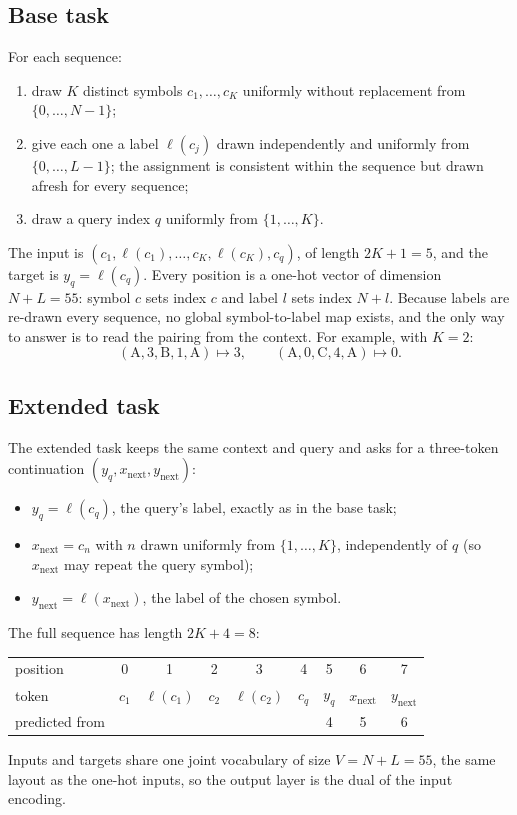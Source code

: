 \documentclass[11pt,a4paper]{article}
\newcommand{\xnext}{x_{\mathrm{next}}}
\newcommand{\ynext}{y_{\mathrm{next}}}
\newcommand{\yq}{y_{q}}
\begin{document}
\subsection{Base task}
For each sequence:
\begin{enumerate}[leftmargin=1.6em]
  \item draw $K$ distinct symbols $c_1,\dots,c_K$ uniformly without
        replacement from $\{0,\dots,N-1\}$;
  \item give each one a label $\ell(c_j)$ drawn independently and uniformly
        from $\{0,\dots,L-1\}$; the assignment is consistent within the
        sequence but drawn afresh for every sequence;
  \item draw a query index $q$ uniformly from $\{1,\dots,K\}$.
\end{enumerate}
The input is $(c_1,\ell(c_1),\dots,c_K,\ell(c_K),c_q)$, of length $2K+1=5$,
and the target is $\yq=\ell(c_q)$. Every position is a one-hot vector of
dimension $N+L=55$: symbol $c$ sets index $c$ and label $l$ sets index $N+l$.
Because labels are re-drawn every sequence, no global symbol-to-label map
exists, and the only way to answer is to read the pairing from the context.
For example, with $K=2$:
\[
  (\mathrm{A},3,\mathrm{B},1,\mathrm{A}) \mapsto 3,
  \qquad
  (\mathrm{A},0,\mathrm{C},4,\mathrm{A}) \mapsto 0 .
\]

\subsection{Extended task}
The extended task keeps the same context and query and asks for a
three-token continuation $(\yq,\xnext,\ynext)$:
\begin{itemize}[leftmargin=1.4em]
  \item $\yq=\ell(c_q)$, the query's label, exactly as in the base task;
  \item $\xnext=c_n$ with $n$ drawn uniformly from $\{1,\dots,K\}$,
        independently of $q$ (so $\xnext$ may repeat the query symbol);
  \item $\ynext=\ell(\xnext)$, the label of the chosen symbol.
\end{itemize}
The full sequence has length $2K+4=8$:
\begin{center}
\small
\begin{tabular}{l*{8}{c}}
\toprule
position & 0 & 1 & 2 & 3 & 4 & 5 & 6 & 7\\
token & $c_1$ & $\ell(c_1)$ & $c_2$ & $\ell(c_2)$ & $c_q$ & $\yq$ & $\xnext$ & $\ynext$\\
predicted from & & & & & & 4 & 5 & 6\\
\bottomrule
\end{tabular}
\end{center}
Inputs and targets share one joint vocabulary of size $V=N+L=55$, the same
layout as the one-hot inputs, so the output layer is the dual of the input
encoding.
\end{document}
